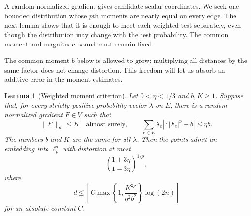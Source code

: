\documentclass[11pt]{article}
\newcommand{\E}{\mathbb E}
\newtheorem{lemma}[theorem]{Lemma}
\theoremstyle{remark}
\numberwithin{equation}{section}
\begin{document}
A random normalized gradient gives candidate scalar coordinates. We seek
one bounded distribution whose $p$th moments are nearly equal on every
edge. The next lemma shows that it is enough to meet each weighted test
separately, even though the distribution may change with the test
probability. The common moment and magnitude bound must remain fixed.

The common moment $b$ below is allowed to grow: multiplying all
distances by the same factor does not change distortion. This freedom
will let us absorb an additive error in the moment estimates.

\begin{lemma}[Weighted moment criterion]\label{lem:weighted}
Let $0<\eta<1/3$ and $b,K\ge1$. Suppose that, for every strictly
positive probability vector $\lambda$ on $E$, there is a random
normalized gradient $F\in V$ such that
\begin{equation}\label{eq:weighted-target}
 \|F\|_\infty\le K\quad\text{almost surely},\qquad
 \sum_{e\in E}\lambda_e\left|\E|F_e|^p-b\right|\le\eta b.
\end{equation}
The numbers $b$ and $K$ are the same for all $\lambda$. Then the points
admit an embedding into $\ell_p^d$ with distortion at most
\[
 \left(\frac{1+3\eta}{1-3\eta}\right)^{1/p},
\]
where
\begin{equation}\label{eq:sampling-dimension}
 d\le\left\lceil
 C\max\left\{1,\frac{K^{2p}}{\eta^2b^2}\right\}\log(2n)
 \right\rceil
\end{equation}
for an absolute constant $C$.
\end{lemma}
\end{document}
